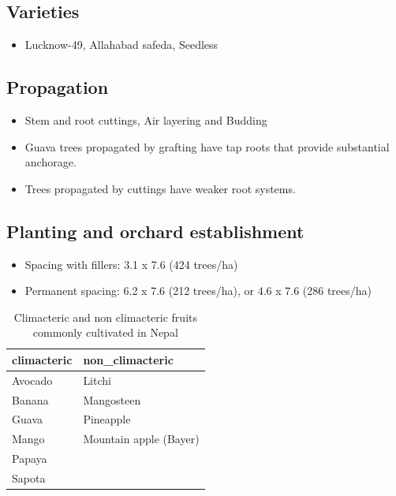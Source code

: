 \documentclass[
]{book}
\providecommand{\tightlist}{%
  \setlength{\itemsep}{0pt}\setlength{\parskip}{0pt}}
\begin{document}
\hypertarget{varieties}{%
\subsection{Varieties}\label{varieties}}

\begin{itemize}
\tightlist
\item
  Lucknow-49, Allahabad safeda, Seedless
\end{itemize}

\hypertarget{propagation}{%
\subsection{Propagation}\label{propagation}}

\begin{itemize}
\tightlist
\item
  Stem and root cuttings, Air layering and Budding
\item
  Guava trees propagated by grafting have tap roots that provide substantial anchorage.
\item
  Trees propagated by cuttings have weaker root
  systems.
\end{itemize}

\hypertarget{planting-and-orchard-establishment}{%
\subsection{Planting and orchard establishment}\label{planting-and-orchard-establishment}}

\begin{itemize}
\tightlist
\item
  Spacing with fillers: 3.1 x 7.6 (424 trees/ha)
\item
  Permanent spacing: 6.2 x 7.6 (212 trees/ha), or 4.6 x 7.6 (286 trees/ha)
\end{itemize}

\begin{table}

\caption{\label{tab:climac-vs-nonclim}Climacteric and non climacteric fruits commonly cultivated in Nepal}
\centering
\begin{tabular}[t]{ll}
\toprule
climacteric & non\_climacteric\\
\midrule
\rowcolor{gray!6}  Avocado & Litchi\\
Banana & Mangosteen\\
\rowcolor{gray!6}  Guava & Pineapple\\
Mango & Mountain apple (Bayer)\\
\rowcolor{gray!6}  Papaya & \\
\addlinespace
Sapota & \\
\bottomrule
\end{tabular}
\end{table}
\end{document}
